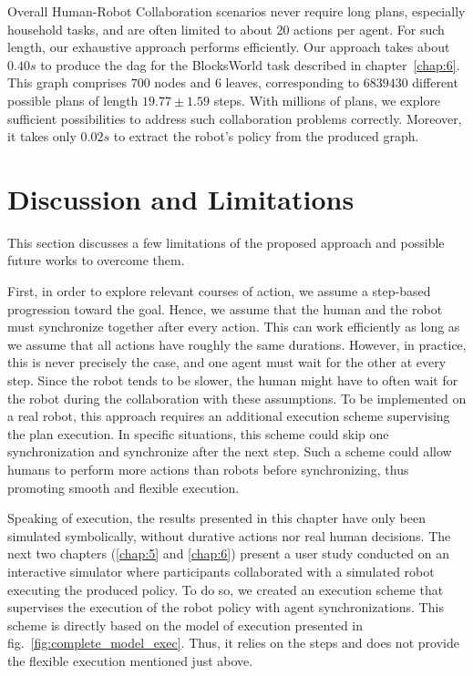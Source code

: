 Overall Human-Robot Collaboration scenarios never require long plans, especially household tasks, and are often limited to about 20 actions per agent. For such length, our exhaustive approach performs efficiently. Our approach takes about $0.40s$ to produce the \acrshort{dag} for the BlocksWorld task described in chapter~\ref{chap:6}. This graph comprises $700$ nodes and $6$ leaves, corresponding to $6839430$ different possible plans of length $19.77 \pm 1.59$ steps. With millions of plans, we explore sufficient possibilities to address such collaboration problems correctly. Moreover, it takes only $0.02s$ to extract the robot's policy from the produced graph. 


\section{Discussion and Limitations}


This section discusses a few limitations of the proposed approach and possible future works to overcome them. 

First, in order to explore relevant courses of action, we assume a step-based progression toward the goal. Hence, we assume that the human and the robot must synchronize together after every action. This can work efficiently as long as we assume that all actions have roughly the same durations. However, in practice, this is never precisely the case, and one agent must wait for the other at every step. Since the robot tends to be slower, the human might have to often wait for the robot during the collaboration with these assumptions. To be implemented on a real robot, this approach requires an additional execution scheme supervising the plan execution. In specific situations, this scheme could skip one synchronization and synchronize after the next step. Such a scheme could allow humans to perform more actions than robots before synchronizing, thus promoting smooth and flexible execution.

Speaking of execution, the results presented in this chapter have only been simulated symbolically, without durative actions nor real human decisions. The next two chapters (\ref{chap:5} and \ref{chap:6}) present a user study conducted on an interactive simulator where participants collaborated with a simulated robot executing the produced policy. To do so, we created an execution scheme that supervises the execution of the robot policy with agent synchronizations. This scheme is directly based on the model of execution presented in fig.~\ref{fig:complete_model_exec}. Thus, it relies on the steps and does not provide the flexible execution mentioned just above. 

